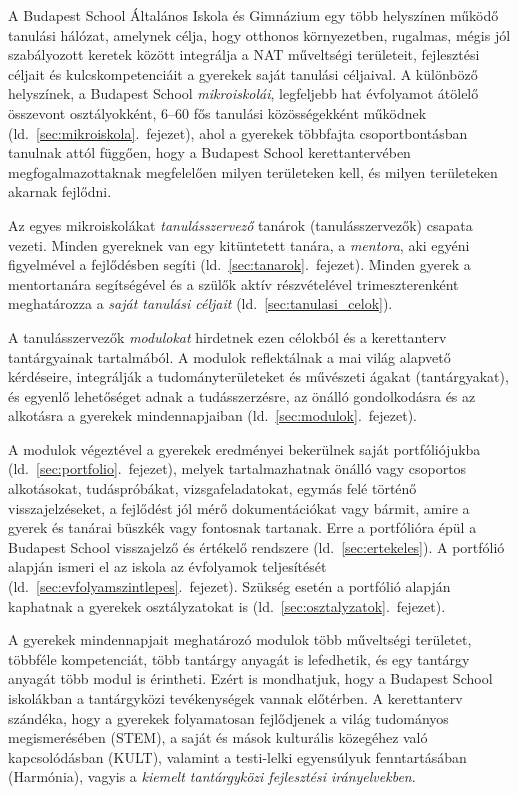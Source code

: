 A Budapest School Általános Iskola és Gimnázium egy több helyszínen működő tanulási hálózat, amelynek célja, hogy otthonos környezetben, rugalmas, mégis jól szabályozott keretek között integrálja a NAT műveltségi területeit, fejlesztési céljait és kulcskompetenciáit a gyerekek saját tanulási céljaival. A különböző helyszínek, a Budapest School \emph{mikroiskolái}, legfeljebb hat évfolyamot átölelő összevont osztályokként, 6--60 fős tanulási közösségekként működnek (ld.~\ref{sec:mikroiskola}.~fejezet), ahol a gyerekek többfajta csoportbontásban tanulnak attól függően, hogy a Budapest School kerettantervében megfogalmazottaknak megfelelően milyen területeken kell, és milyen területeken akarnak fejlődni.

Az egyes mikroiskolákat \emph{tanulásszervező} tanárok (tanulásszervezők) csapata vezeti. Minden gyereknek van egy kitüntetett tanára, a \emph{mentora}, aki egyéni figyelmével a fejlődésben segíti (ld.~\ref{sec:tanarok}.~fejezet). Minden gyerek a mentortanára segítségével és a szülők aktív részvételével trimeszterenként meghatározza a \emph{saját tanulási céljait}
(ld.~\ref{sec:tanulasi_celok}).

A tanulásszervezők \emph{modulokat} hirdetnek ezen célokból és a kerettanterv tantárgyainak tartalmából. A modulok reflektálnak a mai világ alapvető kérdéseire, integrálják	a tudományterületeket és művészeti ágakat (tantárgyakat), és egyenlő lehetőséget adnak a tudásszerzésre, az önálló gondolkodásra és az alkotásra a gyerekek mindennapjaiban 
(ld.~\ref{sec:modulok}.~fejezet).

A modulok végeztével a gyerekek eredményei bekerülnek saját portfóliójukba (ld.~\ref{sec:portfolio}.~fejezet), melyek tartalmazhatnak önálló vagy csoportos alkotásokat, tudáspróbákat, vizsgafeladatokat, egymás felé történő visszajelzéseket, a fejlődést jól mérő dokumentációkat vagy bármit, amire a gyerek és tanárai büszkék vagy fontosnak tartanak. Erre a portfólióra épül a Budapest School visszajelző és értékelő rendszere (ld.~\ref{sec:ertekeles}). A portfólió alapján ismeri el az iskola az évfolyamok teljesítését (ld.~\ref{sec:evfolyamszintlepes}.~fejezet). Szükség esetén a portfólió alapján kaphatnak a gyerekek osztályzatokat is (ld.~\ref{sec:osztalyzatok}.~fejezet).

A gyerekek mindennapjait meghatározó modulok több műveltségi területet, többféle kompetenciát, több tantárgy anyagát is lefedhetik, és egy tantárgy anyagát több modul is érintheti.
Ezért is mondhatjuk, hogy a Budapest School iskolákban a tantárgyközi tevékenységek vannak előtérben. 
A kerettanterv szándéka, hogy a gyerekek folyamatosan fejlődjenek a világ tudományos megismerésében (STEM), a saját és mások kulturális közegéhez való kapcsolódásban (KULT), valamint a testi-lelki egyensúlyuk fenntartásában (Harmónia), vagyis a \emph{kiemelt tantárgyközi fejlesztési irányelvekben}. 

